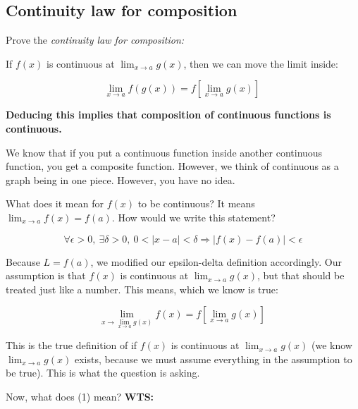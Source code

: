 \documentclass[12pt]{article}
\theoremstyle{plain}
\theoremstyle{remark}
\theoremstyle{definition}
\begin{document}
\subsection{Continuity law for
composition}

Prove the \emph{continuity law for composition:}

If \(f(x)\) is continuous at \(\lim_{x \rightarrow a}{g(x)}\), then we
can move the limit inside:


\begin{equation}
\lim_{x \rightarrow a}{f\left( g(x) \right) = f\left\lbrack \lim_{x \rightarrow a}{g(x)} \right\rbrack}\ \tag{1}  \label{eq:1}
\end{equation}


\textbf{Deducing this implies that composition of continuous functions
is continuous.}

We know that if you put a continuous function inside another continuous
function, you get a composite function. However, we think of continuous
as a graph being in one piece. However, you have no idea.

\begin{framed}

What does it mean for \(f(x)\) to be continuous? It means
\(\lim_{x \rightarrow a}{f(x)} = f(a)\). How would we write this
statement?

\[\forall\epsilon > 0,\ \exists\delta > 0,\ 0 < |x - a| < \delta \Rightarrow |f(x) - f(a)| < \epsilon\]

\end{framed}



Because \(L = f(a)\), we modified our epsilon-delta definition
accordingly. Our assumption is that \(f(x)\) is continuous at
\(\lim_{x \rightarrow a}{g(x)}\), but that should be treated just like a
number. This means, which we know is true:


\begin{equation}
\lim_{x \rightarrow \lim_{x \rightarrow a}{g(x)}}{f(x)} = f\left\lbrack \lim_{x \rightarrow a}{g(x)} \right\rbrack\ \tag{2}  \label{eq:2}
\end{equation}


This is the true definition of if \(f(x)\) is continuous at
\(\lim_{x \rightarrow a}{g(x)}\) (we know
\(\lim_{x \rightarrow a}{g(x)}\) exists, because we must assume
everything in the assumption to be true). This is what the question is
asking.

Now, what does (1) mean? \textbf{WTS:}
\end{document}
